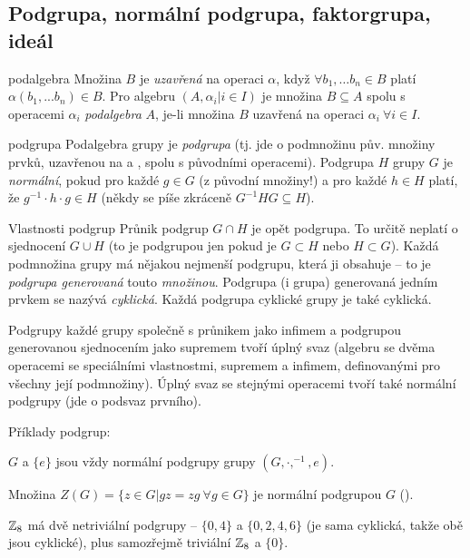 \subsection{Podgrupa, normální podgrupa, faktorgrupa, ideál}

\begin{definiceN}{podalgebra}
Množina $B$ je \emph{uzavřená} na operaci $\alpha$, když $\forall b_1,\dots b_n \in B$ platí $\alpha(b_1, ... b_n) \in B$. Pro algebru $(A, \alpha_i|i\in I)$ je množina $B\subseteq A$ spolu s operacemi $\alpha_i$ \emph{podalgebra} $A$, je-li množina $B$ uzavřená na operaci $\alpha_i\ \forall i\in I$.
\end{definiceN}

\begin{definiceN}{podgrupa}
Podalgebra grupy je \emph{podgrupa} (tj. jde o podmnožinu pův. množiny prvků, uzavřenou na \uv{$\cdot$} a , spolu s původními operacemi). Podgrupa $H$ grupy $G$ je \emph{normální}, pokud pro každé $g \in G$ (z původní množiny!) a pro každé $h \in H$ platí, že $g^{-1}\cdot h\cdot g \in H$ (někdy se píše zkráceně $G^{-1}HG\subseteq H$).
\end{definiceN}

\begin{poznamkaN}{Vlastnosti podgrup}
Průnik podgrup $G\cap H$ je opět podgrupa. To určitě neplatí o sjednocení $G\cup H$ (to je podgrupou jen pokud je $G\subset H$ nebo $H\subset G$). Každá podmnožina grupy má nějakou nejmenší podgrupu, která ji obsahuje -- to je \emph{podgrupa generovaná} touto \emph{množinou}. Podgrupa (i grupa) generovaná jedním prvkem se nazývá \emph{cyklická}. Každá podgrupa cyklické grupy je také cyklická. 

Podgrupy každé grupy společně s průnikem jako infimem a podgrupou generovanou sjednocením jako supremem tvoří úplný svaz (algebru se dvěma operacemi se speciálními vlastnostmi, supremem a infimem, definovanými pro všechny její podmnožiny). Úplný svaz se stejnými operacemi tvoří také normální podgrupy (jde o podsvaz prvního).
\end{poznamkaN}

\begin{priklady}
Příklady podgrup:
\begin{pitemize}
    \item $G$ a $\{e\}$ jsou vždy normální podgrupy grupy $(G,\cdot,^{-1},e)$. 
    \item Množina $Z(G)=\{z\in G|gz = zg\ \forall g\in G\}$ je normální podgrupou $G$ ().
    \item $\mathbb{Z}_8$ má dvě netriviální podgrupy -- $\{0,4\}$ a $\{0,2,4,6\}$ (je sama cyklická, takže obě jsou cyklické), plus samozřejmě triviální $\mathbb{Z}_8$ a $\{0\}$.
\end{pitemize}
\end{priklady}

